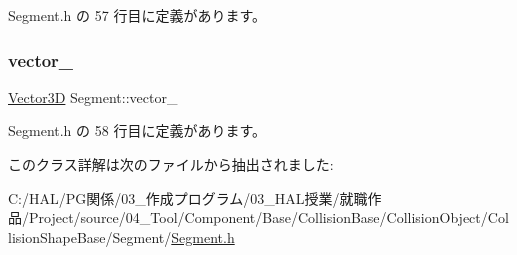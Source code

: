  Segment.\+h の 57 行目に定義があります。

\mbox{\label{class_segment_a6834b88ecae688f0fc5b4ed95fab824b}} 
\subsubsection{\texorpdfstring{vector\+\_\+}{vector\_}}
{\footnotesize\ttfamily \mbox{\hyperlink{class_vector3_d}{Vector3D}} Segment\+::vector\+\_\+}



 Segment.\+h の 58 行目に定義があります。



このクラス詳解は次のファイルから抽出されました\+:\begin{DoxyCompactItemize}
\item 
C\+:/\+H\+A\+L/\+P\+G関係/03\+\_\+作成プログラム/03\+\_\+\+H\+A\+L授業/就職作品/\+Project/source/04\+\_\+\+Tool/\+Component/\+Base/\+Collision\+Base/\+Collision\+Object/\+Collision\+Shape\+Base/\+Segment/\mbox{\hyperlink{_segment_8h}{Segment.\+h}}\end{DoxyCompactItemize}

